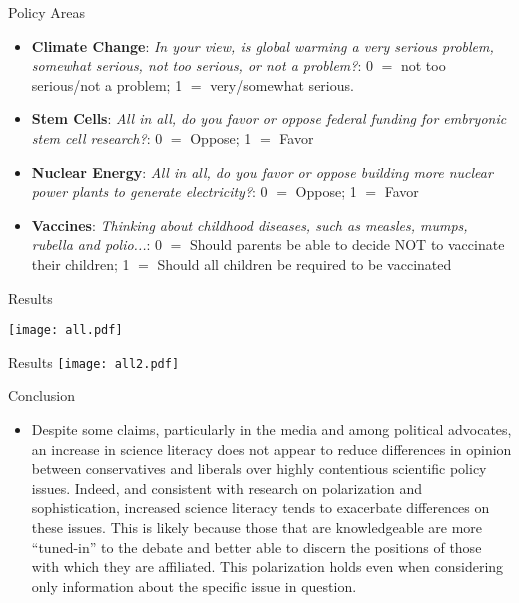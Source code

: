 \documentclass{beamer}
\begin{document}
\begin{frame}{Policy Areas}
\begin{itemize}
\item \textbf{Climate Change}: \textit{In your view, is global warming
    a very serious problem, somewhat serious, not too serious, or not
    a problem?}: 0 $=$ not too serious/not a problem; 1 $=$
  very/somewhat serious.
  
\item \textbf{Stem Cells}: \textit{All in all, do you favor or oppose
    federal funding for embryonic stem cell research?}: 0 $=$ Oppose;
  1 $=$ Favor

\item \textbf{Nuclear Energy}: \textit{All in all, do you favor or
    oppose building more nuclear power plants to generate
    electricity?}: 0 $=$ Oppose; 1 $=$ Favor 

\item \textbf{Vaccines}: \textit{Thinking about childhood diseases,
    such as measles, mumps, rubella and polio...}: 0 $=$ Should
  parents be able to decide NOT to vaccinate their children; 1 $=$
  Should all children be required to be vaccinated 

\end{itemize}
\end{frame}

\begin{frame}{Results}
\begin{center}
\texttt{[image: all.pdf]}
\end{center}  
\end{frame}

\begin{frame}{Results}
\texttt{[image: all2.pdf]} 
\end{frame}


\begin{frame}{Conclusion}
  \begin{itemize}
  \item Despite some claims, particularly in the media and among
    political advocates, an increase in science literacy does not
    appear to reduce differences in opinion between conservatives and
    liberals over highly contentious scientific policy issues. Indeed,
    and consistent with research on polarization and sophistication,
    increased science literacy tends to exacerbate differences on
    these issues. This is likely because those that are knowledgeable
    are more “tuned-in” to the debate and better able to discern the
    positions of those with which they are affiliated. This
    polarization holds even when considering only information about
    the specific issue in question. 
  \end{itemize}
\end{frame}
\end{document}
